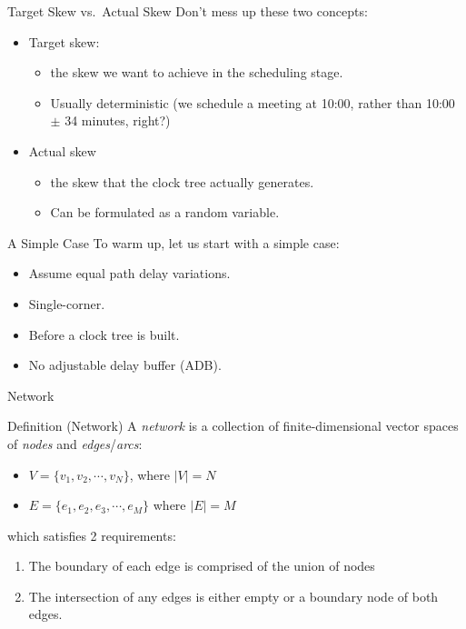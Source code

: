 \documentclass[
  ignorenonframetext,
]{beamer}
\providecommand{\tightlist}{%
  \setlength{\itemsep}{0pt}\setlength{\parskip}{0pt}}
\begin{document}
\begin{frame}{Target Skew vs.~Actual Skew}
\protect\hypertarget{target-skew-vs.-actual-skew}{}
Don't mess up these two concepts:

\begin{itemize}
\tightlist
\item
  Target skew:

  \begin{itemize}
  \tightlist
  \item
    the skew we want to achieve in the scheduling stage.
  \item
    Usually deterministic (we schedule a meeting at 10:00, rather than
    10:00 \(\pm\) 34 minutes, right?)
  \end{itemize}
\item
  Actual skew

  \begin{itemize}
  \tightlist
  \item
    the skew that the clock tree actually generates.
  \item
    Can be formulated as a random variable.
  \end{itemize}
\end{itemize}
\end{frame}

\begin{frame}{A Simple Case}
\protect\hypertarget{a-simple-case}{}
To warm up, let us start with a simple case:

\begin{itemize}
\tightlist
\item
  Assume equal path delay variations.
\item
  Single-corner.
\item
  Before a clock tree is built.
\item
  No adjustable delay buffer (ADB).
\end{itemize}
\end{frame}

\begin{frame}{Network}
\protect\hypertarget{network}{}
\begin{block}{Definition (Network)}
\protect\hypertarget{definition-network}{}
A \emph{network} is a collection of finite-dimensional vector spaces of
\emph{nodes} and \emph{edges}/\emph{arcs}:

\begin{itemize}
\tightlist
\item
  \(V = \{v_1, v_2, \cdots, v_N \}\), where \(|V| = N\)
\item
  \(E = \{e_1, e_2, e_3, \cdots, e_M \}\) where \(|E| = M\)
\end{itemize}

which satisfies 2 requirements:

\begin{enumerate}
\tightlist
\item
  The boundary of each edge is comprised of the union of nodes
\item
  The intersection of any edges is either empty or a boundary node of
  both edges.
\end{enumerate}
\end{block}
\end{frame}
\end{document}
